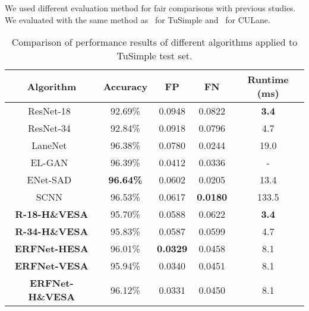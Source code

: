 \documentclass[10pt,twocolumn,letterpaper]{article}
\begin{document}
We used different evaluation method for fair comparisons with previous studies. We evaluated with the same method as~\cite{ghafoorian2018gan, hou2019learning, neven2018towards, pan2017spatial} for TuSimple and~\cite{hou2019learning, pan2017spatial, qin2020ultra, yoo2020end} for CULane.

\begin{table}[!t]
	\centering
	\scriptsize{
		\begin{tabular}{c|c|c|c|c}
			\hline
			Algorithm & Accuracy & FP & FN & Runtime (ms)\\
			\hline \hline
			ResNet-18~\cite{he2016deep} & 92.69\% & 0.0948 & 0.0822 & \textbf{3.4} \\
			ResNet-34~\cite{he2016deep} & 92.84\% & 0.0918 & 0.0796 & 4.7 \\
			LaneNet~\cite{neven2018towards} & 96.38\% & 0.0780 & 0.0244 & 19.0 \\
			EL-GAN~\cite{ghafoorian2018gan} & 96.39\% & 0.0412 & 0.0336 & \-- \\
			ENet-SAD~\cite{hou2019learning} & \textbf{96.64\%} & 0.0602 & 0.0205 & 13.4 \\
			SCNN~\cite{pan2017spatial} & 96.53\% & 0.0617 & \textbf{0.0180} & 133.5 \\
			\hline \hline
			\textbf{R-18-H\&VESA} & 95.70\% & 0.0588 & 0.0622 & \textbf{3.4} \\
			\textbf{R-34-H\&VESA} & 95.83\% & 0.0587 & 0.0599 & 4.7 \\
			\textbf{ERFNet-HESA} & 96.01\% & \textbf{0.0329} & 0.0458 & 8.1 \\
			\textbf{ERFNet-VESA} & 95.94\% & 0.0340 & 0.0451 & 8.1 \\
			\textbf{ERFNet-H\&VESA} & 96.12\% & 0.0331 & 0.0450 & 8.1 \\
			\hline
\end{tabular}
	}
	\caption{Comparison of performance results of different algorithms applied to TuSimple test set.}
	\label{table:two}
\end{table}
\end{document}
